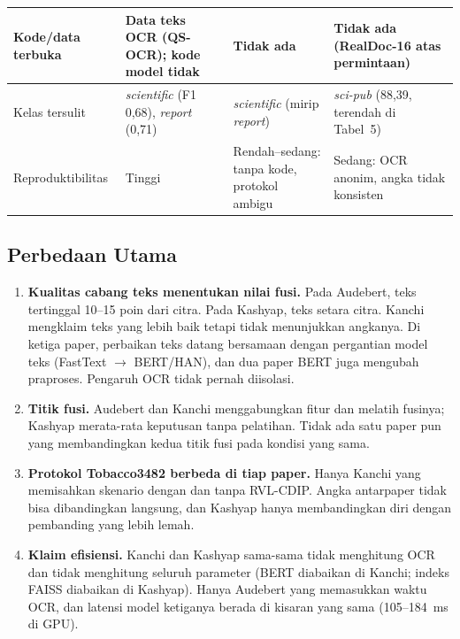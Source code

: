 \begin{table}[H]
\begin{tabularx}{\textwidth}{|l|>{\raggedright\arraybackslash}X|>{\raggedright\arraybackslash}X|>{\raggedright\arraybackslash}X|}
    Kode/data terbuka & Data teks OCR (QS-OCR); kode model tidak & Tidak ada & Tidak ada (RealDoc-16 atas permintaan) \\ \hline
    Kelas tersulit & \emph{scientific} (F1 0,68), \emph{report} (0,71) & \emph{scientific} (mirip \emph{report}) & \emph{sci-pub} (88,39, terendah di Tabel~5) \\ \hline
    Reproduktibilitas & Tinggi & Rendah--sedang: tanpa kode, protokol ambigu & Sedang: OCR anonim, angka tidak konsisten \\ \hline
  \end{tabularx}
\end{table}

\subsection{Perbedaan Utama}
\begin{enumerate}
  \item \textbf{Kualitas cabang teks menentukan nilai fusi.} Pada Audebert, teks tertinggal
        10--15 poin dari citra. Pada Kashyap, teks setara citra. Kanchi mengklaim teks yang
        lebih baik tetapi tidak menunjukkan angkanya. Di ketiga paper, perbaikan teks datang
        bersamaan dengan pergantian model teks (FastText $\to$ BERT/HAN), dan dua paper
        BERT juga mengubah praproses. Pengaruh OCR tidak pernah diisolasi.
  \item \textbf{Titik fusi.} Audebert dan Kanchi menggabungkan fitur dan melatih fusinya;
        Kashyap merata-rata keputusan tanpa pelatihan. Tidak ada satu paper pun yang
        membandingkan kedua titik fusi pada kondisi yang sama.
  \item \textbf{Protokol Tobacco3482 berbeda di tiap paper.} Hanya Kanchi yang memisahkan
        skenario dengan dan tanpa RVL-CDIP. Angka antarpaper tidak bisa dibandingkan
        langsung, dan Kashyap hanya membandingkan diri dengan pembanding yang lebih lemah.
  \item \textbf{Klaim efisiensi.} Kanchi dan Kashyap sama-sama tidak menghitung OCR dan
        tidak menghitung seluruh parameter (BERT diabaikan di Kanchi; indeks FAISS diabaikan
        di Kashyap). Hanya Audebert yang memasukkan waktu OCR, dan latensi model ketiganya
        berada di kisaran yang sama (105--184~ms di GPU).
\end{enumerate}

